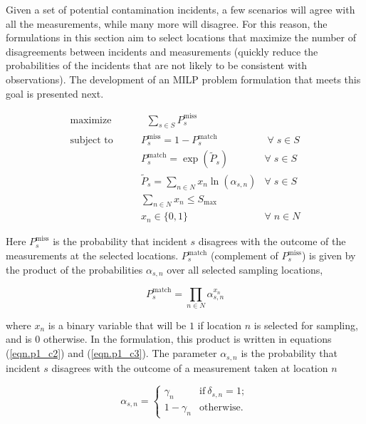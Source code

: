 Given a set of potential contamination incidents, a few scenarios will agree with all the measurements, while many more will disagree. For this reason, the formulations in this section aim to select locations that maximize the number of disagreements between incidents and measurements (quickly reduce the probabilities of the incidents that are not likely to be consistent with observations). The development of an MILP problem formulation that meets this goal is presented next.

\begin{align}
\textrm{maximize} \qquad&\;\; \sum_{s\in S}P_{s}^{\textrm{miss}} &  \label{eqn.p1_obj}\\
\textrm{subject to} \qquad &P_{s}^{\textrm{miss}} = 1-P_{s}^{\textrm{match}} & \;\forall \; s \in S \label{eqn.p1_c1}\\
&P_{s}^{\textrm{match}} = \exp(\tilde{P}_{s}) & \forall \; s \in S \label{eqn.p1_c2}\\
&\tilde{P}_{s} = \sum_{n\in N} x_n \ln(\alpha_{s,n}) & \forall \; s \in S \label{eqn.p1_c3}\\
&\sum_{n\in N} x_n \le S_{\textrm{max}} & \label{eqn.p1_c4}\\
&x_{n} \in \{0,1\} & \forall \; n \in N  \label{eqn.p1_c5}
\end{align}

Here $P_{s}^{\textrm{miss}}$ is the probability that incident $s$ disagrees with the outcome of the measurements at the selected locations. $P_s^{\textrm{match}}$ (complement of  $P_{s}^{\textrm{miss}}$) is given by the product of the probabilities $\alpha_{s,n}$ over all selected sampling locations,   

\begin{equation}
P_s^{\textrm{match}}= \prod_{n\in N} \alpha_{s,n}^{x_n}
\end{equation}

where $x_n$ is a binary variable that will be $1$ if location $n$ is selected for sampling, and is $0$ otherwise. In the formulation, this product is written in equations (\ref{eqn.p1_c2}) and (\ref{eqn.p1_c3}). The parameter $\alpha_{s,n}$ is the probability that incident $s$ disagrees with the outcome of a measurement taken at location $n$

\begin{equation}
\alpha_{s,n} = \left\{ \begin{array}{ll}
         \gamma_n & \mathrm{if }\ \delta_{s,n} = 1;\\
        1-\gamma_n & \mathrm{otherwise}.\end{array} \right. 
\label{alphasn}
\end{equation}

